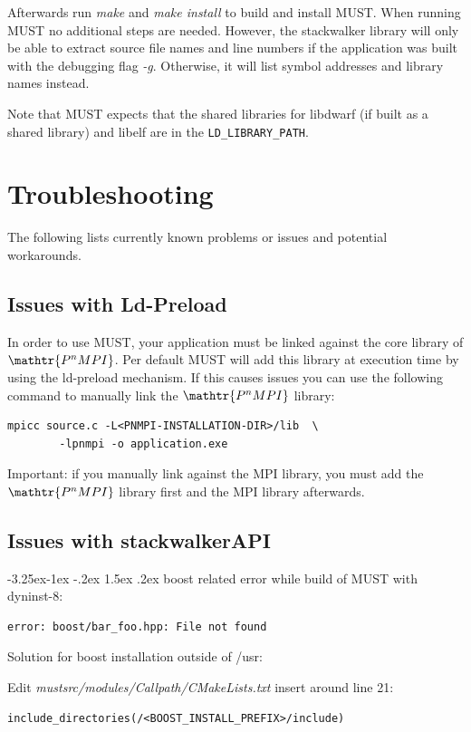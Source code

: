 \documentclass[english]{scrartcl}
\makeatletter
\newcommand{\pnmpi}{$\mathop{\mathtr{P^nMPI}}\nolimits$\xspace}
\renewcommand\paragraph{\@startsection{paragraph}{4}{\z@}%
  {-3.25ex\@plus -1ex \@minus -.2ex}%
  {1.5ex \@plus .2ex}%
  {\normalfont\normalsize\bfseries}}
\makeatother
\begin{document}
Afterwards run \emph{make} and \emph{make install} to build and install MUST.
When running MUST no additional steps are needed. However, the stackwalker
library will only be able to extract source file names and line numbers if the
application was built with the debugging flag \emph{-g}. Otherwise, it will list
symbol addresses and library names instead.

Note that MUST expects that the shared libraries for libdwarf (if built as a shared library) 
and libelf are in the \texttt{LD\_LIBRARY\_PATH}.

\section{Troubleshooting}

The following lists currently known problems or issues and potential
workarounds.

\subsection{Issues with Ld-Preload}
In order to use MUST, your application must be linked against the core library of
\pnmpi. Per default MUST will add this library at execution time by using the
ld-preload mechanism. If this causes issues you can use the following
command to manually link the \pnmpi library:
\begin{verbatim}
mpicc source.c -L<PNMPI-INSTALLATION-DIR>/lib  \
        -lpnmpi -o application.exe
\end{verbatim}

Important: if you manually link against the MPI library, you must add the \pnmpi
library first and the MPI library afterwards.

\subsection{Issues with stackwalkerAPI}
\label{subsect:dyninst-issues}

\paragraph{boost related error while build of MUST with dyninst-8:}
\begin{verbatim}
error: boost/bar_foo.hpp: File not found
\end{verbatim}
Solution for boost installation outside of /usr:

Edit \emph{mustsrc/modules/Callpath/CMakeLists.txt} insert around line 21:
\begin{verbatim}
include_directories(/<BOOST_INSTALL_PREFIX>/include)
\end{verbatim}
\end{document}
